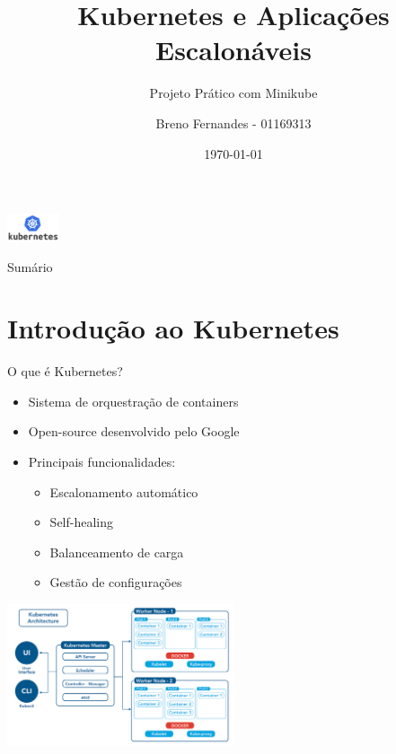 \documentclass{beamer}
\title{Kubernetes e Aplicações Escalonáveis}
\subtitle{Projeto Prático com Minikube}
\author{Breno Fernandes - 01169313}
\institute{Uninassau}
\date{\today}
\begin{document}
\begin{frame}
    \centering
    \includegraphics[width=1.5cm]{Kubernetes-Logo.png}\\[0.5cm]
    \titlepage
\end{frame}

\begin{frame}{Sumário}
    \tableofcontents
\end{frame}

\section{Introdução ao Kubernetes}

\begin{frame}{O que é Kubernetes?}
    \begin{itemize}
        \item Sistema de orquestração de containers
        \item Open-source desenvolvido pelo Google
        \item Principais funcionalidades:
        \begin{itemize}
            \item Escalonamento automático
            \item Self-healing
            \item Balanceamento de carga
            \item Gestão de configurações
        \end{itemize}
    \end{itemize}
    \centering
    \includegraphics[width=0.5\textwidth]{k8s-architecture.png}
\end{frame}
\end{document}
